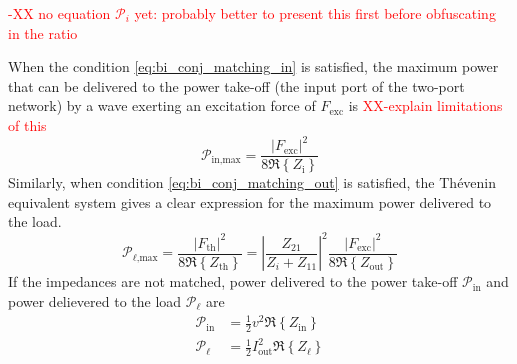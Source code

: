 \documentclass[lettersize,journal]{IEEEtran}
\newcommand{\rc}[1]{\textcolor{red}{#1}}
\begin{document}
\rc{-XX no equation $\mathcal{P}_i$ yet: probably better to present this first before obfuscating in the ratio}

When the condition \eqref{eq:bi_conj_matching_in} is satisfied, the maximum power that can be delivered to the power take-off (the input port of the two-port network) by a wave exerting an excitation force of $F_{\textrm{exc}}$ \cite{Falnes:2002aa} is \rc{XX-explain limitations of this}
\begin{equation}
        \mathcal{P}_{\textrm{in,max}} = \frac{| F_{\textrm{exc}} |^2 }{ 8 \Re \left\{ Z_{\textrm{i}} \right\} }
\end{equation}
Similarly, when condition \eqref{eq:bi_conj_matching_out} is satisfied, the Th\'{e}venin equivalent system gives a clear expression for the maximum power delivered to the load.
\begin{equation}
        \mathcal{P}_{\ell\textrm{,max}} = \frac{| F_{\textrm{th}} |^2 }{ 8 \Re \left\{ Z_{\textrm{th}} \right\} }
        = \left| \frac{ Z_{21} }{ Z_i + Z_{11} } \right| ^2 \frac{ | F_{\textrm{exc}} |^2 }{ 8 \Re \left\{ Z_{\textrm{out}} \right\} } \label{eq:max_power_delivered_thevenin}
\end{equation}
If the impedances are not matched, power delivered to the power take-off $\mathcal{P}_{\textrm{in}}$ and power delievered to the load $\mathcal{P}_\ell$ are
\begin{subequations}
        \begin{align}
                \mathcal{P}_{\textrm{in}} &= \frac{1}{2} v^2 \Re \left\{ Z_{\textrm{in}} \right\}\\
                \mathcal{P}_\ell &= \frac{1}{2} I_{\textrm{out}}^2 \Re \left\{ Z_{\ell} \right\}
        \end{align}
\end{subequations}
\end{document}
